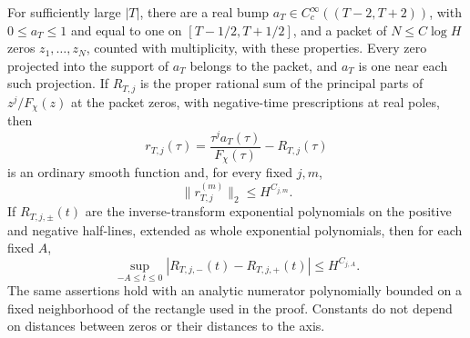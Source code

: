 \begin{lemma}\label{lem:hi-rectangle}
For sufficiently large $|T|$, there are a real bump
$a_T\in C_c^\infty((T-2,T+2))$, with $0\le a_T\le1$ and equal
to one on $[T-1/2,T+1/2]$, and a packet of $N\le C\log H$ zeros
$z_1,\ldots,z_N$, counted with multiplicity, with these properties.
Every zero projected into the support of $a_T$ belongs to the packet,
and $a_T$ is one near each such projection. If $R_{T,j}$ is the proper
rational sum of the principal parts of $z^j/F_\chi(z)$ at the packet
zeros, with negative-time prescriptions at real poles, then
\[
 r_{T,j}(\tau)=\frac{\tau^j a_T(\tau)}{F_\chi(\tau)}-R_{T,j}(\tau)
\]
is an ordinary smooth function and, for every fixed $j,m$,
\begin{equation}\label{eq:hi-remainder}
                  \|r_{T,j}^{(m)}\|_2\le H^{C_{j,m}}.
\end{equation}
If $R_{T,j,\pm}(t)$ are the inverse-transform exponential polynomials
on the positive and negative half-lines, extended as whole exponential
polynomials, then for each fixed $A$,
\begin{equation}\label{eq:hi-residue-difference}
 \sup_{-A\le t\le0}|R_{T,j,-}(t)-R_{T,j,+}(t)|
                                         \le H^{C_{j,A}}.
\end{equation}
The same assertions hold with an analytic numerator polynomially bounded
on a fixed neighborhood of the rectangle used in the proof. Constants
do not depend on distances between zeros or their distances to the axis.
\end{lemma}
